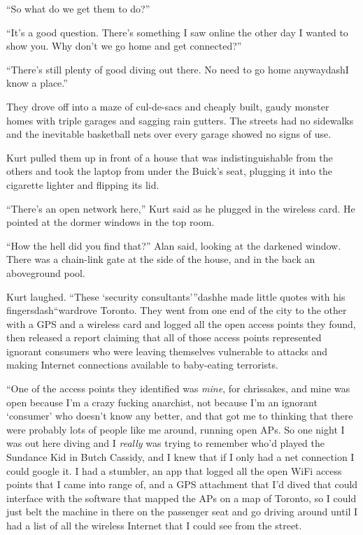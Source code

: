 ``So what do we get them to do?''

``It's a good question.  There's something I saw online the other day
I wanted to show you.  Why don't we go home and get connected?''

``There's still plenty of good diving out there.  No need to go home
anywaydash{}I know a place.''

They drove off into a maze of cul-de-sacs and cheaply built, gaudy
monster homes with triple garages and sagging rain gutters.  The
streets had no sidewalks and the inevitable basketball nets over every
garage showed no signs of use.

Kurt pulled them up in front of a house that was indistinguishable
from the others and took the laptop from under the Buick's seat,
plugging it into the cigarette lighter and flipping its lid.

``There's an open network here,'' Kurt said as he plugged in the
wireless card.  He pointed at the dormer windows in the top room.

``How the hell did you find that?'' Alan said, looking at the darkened
window.  There was a chain-link gate at the side of the house, and in
the back an aboveground pool.

Kurt laughed.  ``These `security consultants'''dash{}he made little quotes
with his fingersdash{}``wardrove Toronto.  They went from one end of the
city to the other with a GPS and a wireless card and logged all the
open access points they found, then released a report claiming that
all of those access points represented ignorant consumers who were
leaving themselves vulnerable to attacks and making Internet
connections available to baby-eating terrorists.

``One of the access points they identified was \textit{mine}, for
chrissakes, and mine was open because I'm a crazy fucking anarchist,
not because I'm an ignorant `consumer' who doesn't know any better,
and that got me to thinking that there were probably lots of people
like me around, running open APs.  So one night I was out here diving
and I \textit{really} was trying to remember who'd played the Sundance
Kid in Butch Cassidy, and I knew that if I only had a net connection I
could google it.  I had a stumbler, an app that logged all the open
WiFi access points that I came into range of, and a GPS attachment
that I'd dived that could interface with the software that mapped the
APs on a map of Toronto, so I could just belt the machine in there on
the passenger seat and go driving around until I had a list of all the
wireless Internet that I could see from the street.

